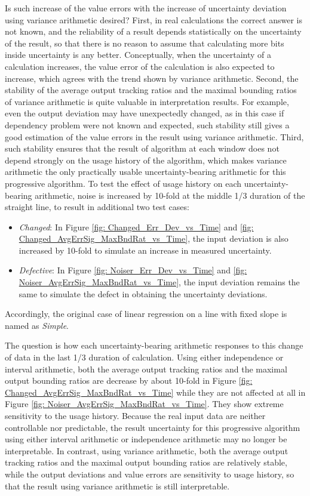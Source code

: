 \documentclass[twoside]{article}
\numberwithin{equation}{section}
\begin{document}
Is such increase of the value errors with the increase of uncertainty deviation using variance arithmetic desired?  First, in real calculations the correct answer is not known, and the reliability of a result depends statistically on the uncertainty of the result, so that there is no reason to assume that calculating more bits inside uncertainty is any better.  Conceptually, when the uncertainty of a calculation increases, the value error of the calculation is also expected to increase, which agrees with the trend shown by variance arithmetic.  Second, the stability of the average output tracking ratios and the maximal bounding ratios of variance arithmetic is quite valuable in interpretation results.  For example, even the output deviation may have unexpectedly changed, as in this case if dependency problem were not known and expected, such stability still gives a good estimation of the value errors in the result using variance arithmetic.  Third, such stability ensures that the result of algorithm at each window does not depend strongly on the usage history of the algorithm, which makes variance arithmetic the only practically usable uncertainty-bearing arithmetic for this progressive algorithm.  To test the effect of usage history on each uncertainty-bearing arithmetic, noise is increased by 10-fold at the middle 1/3 duration of the straight line, to result in additional two test cases:
\begin{itemize}
\item \emph{Changed}: In Figure \ref{fig: Changed_Err_Dev_vs_Time} and \ref{fig: Changed_AvgErrSig_MaxBndRat_vs_Time}, the input deviation is also increased by 10-fold to simulate an increase in measured uncertainty.
\item \emph{Defective}: In Figure \ref{fig: Noiser_Err_Dev_vs_Time} and \ref{fig: Noiser_AvgErrSig_MaxBndRat_vs_Time}, the input deviation remains the same to simulate the defect in obtaining the uncertainty deviations.  
\end{itemize}  
Accordingly, the original case of linear regression on a line with fixed slope is named as \emph{Simple}.

The question is how each uncertainty-bearing arithmetic responses to this change of data in the last 1/3 duration of calculation.  Using either independence or interval arithmetic, both the average output tracking ratios and the maximal output bounding ratios are decrease by about 10-fold in Figure \ref{fig: Changed_AvgErrSig_MaxBndRat_vs_Time} while they are not affected at all in Figure \ref{fig: Noiser_AvgErrSig_MaxBndRat_vs_Time}.  They show extreme sensitivity to the usage history.  Because the real input data are neither controllable nor predictable, the result uncertainty for this progressive algorithm using either interval arithmetic or independence arithmetic may no longer be interpretable.  In contrast, using variance arithmetic, both the average output tracking ratios and the maximal output bounding ratios are relatively stable, while the output deviations and value errors are sensitivity to usage history, so that the result using variance arithmetic is still interpretable.
\end{document}
